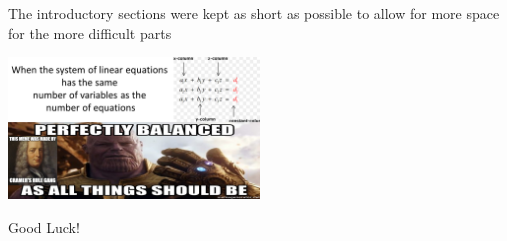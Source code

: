 \documentclass{article}
\begin{document}
The introductory sections were kept as short as possible to allow for more space for the more difficult parts

\newpage








\hspace{1cm}
\begin{center}
    \includegraphics[width=0.5\textwidth]{assets/meme.png}

    \begin{Large}
        Good Luck!
    \end{Large}
\end{center}


\end{document}
